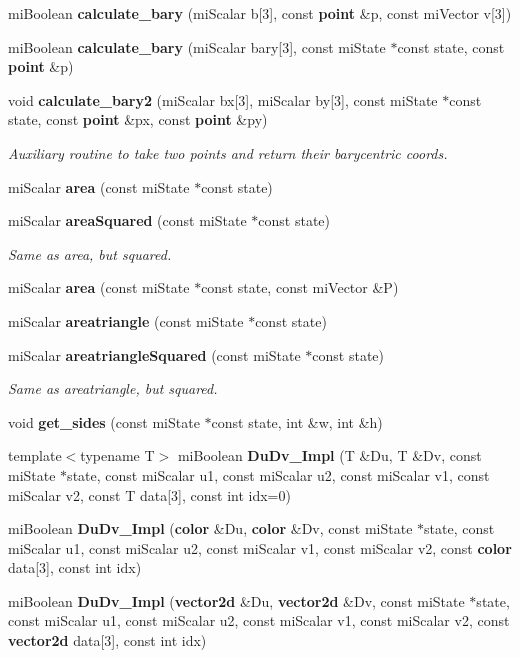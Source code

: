 \begin{CompactItemize}
\item 
mi\-Boolean {\bf calculate\_\-bary} (mi\-Scalar b[3], const {\bf point} \&p, const mi\-Vector v[3])
\item 
mi\-Boolean {\bf calculate\_\-bary} (mi\-Scalar bary[3], const mi\-State $\ast$const state, const {\bf point} \&p)
\item 
void {\bf calculate\_\-bary2} (mi\-Scalar bx[3], mi\-Scalar by[3], const mi\-State $\ast$const state, const {\bf point} \&px, const {\bf point} \&py)
\begin{CompactList}\small\item\em Auxiliary routine to take two points and return their barycentric coords. \item\end{CompactList}\item 
mi\-Scalar {\bf area} (const mi\-State $\ast$const state)
\item 
mi\-Scalar {\bf area\-Squared} (const mi\-State $\ast$const state)
\begin{CompactList}\small\item\em Same as area, but squared. \item\end{CompactList}\item 
mi\-Scalar {\bf area} (const mi\-State $\ast$const state, const mi\-Vector \&P)
\item 
mi\-Scalar {\bf areatriangle} (const mi\-State $\ast$const state)
\item 
mi\-Scalar {\bf areatriangle\-Squared} (const mi\-State $\ast$const state)
\begin{CompactList}\small\item\em Same as areatriangle, but squared. \item\end{CompactList}\item 
void {\bf get\_\-sides} (const mi\-State $\ast$const state, int \&w, int \&h)
\item 
template$<$typename T$>$ mi\-Boolean {\bf Du\-Dv\_\-Impl} (T \&Du, T \&Dv, const mi\-State $\ast$state, const mi\-Scalar u1, const mi\-Scalar u2, const mi\-Scalar v1, const mi\-Scalar v2, const T data[3], const int idx=0)
\item 
mi\-Boolean {\bf Du\-Dv\_\-Impl} ({\bf color} \&Du, {\bf color} \&Dv, const mi\-State $\ast$state, const mi\-Scalar u1, const mi\-Scalar u2, const mi\-Scalar v1, const mi\-Scalar v2, const {\bf color} data[3], const int idx)
\item 
mi\-Boolean {\bf Du\-Dv\_\-Impl} ({\bf vector2d} \&Du, {\bf vector2d} \&Dv, const mi\-State $\ast$state, const mi\-Scalar u1, const mi\-Scalar u2, const mi\-Scalar v1, const mi\-Scalar v2, const {\bf vector2d} data[3], const int idx)

\end{CompactItemize}
